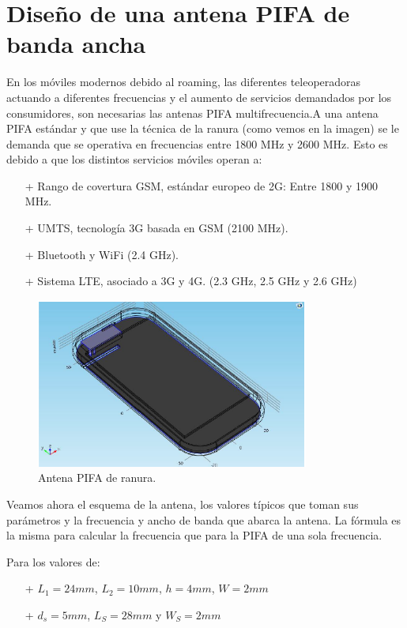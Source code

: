 \documentclass[a4paper,11pt,titlepage]{article}
\begin{document}
\section{Diseño de una antena PIFA de banda ancha}
En los móviles modernos debido al roaming, las diferentes teleoperadoras actuando a diferentes frecuencias y el aumento de servicios demandados por los consumidores, son necesarias las antenas PIFA multifrecuencia.A una antena PIFA estándar y que use la técnica de la ranura (como vemos en la imagen) se le demanda que se operativa en frecuencias entre 1800 MHz y 2600 MHz. Esto es debido a que los distintos servicios móviles operan a:\par
\begin{itemize}
\item[+] Rango de covertura GSM, estándar europeo de 2G: Entre 1800 y 1900 MHz.
\item[+] UMTS, tecnología 3G basada en GSM (2100 MHz).
\item[+] Bluetooth y WiFi (2.4 GHz).
\item[+] Sistema LTE, asociado a 3G y 4G. (2.3 GHz, 2.5 GHz y 2.6 GHz)
\end{itemize}
\begin{figure}[H]
\centering
\includegraphics[width=0.8\textwidth]{pifamulti}
\caption{Antena PIFA de ranura.}
\end{figure}
Veamos ahora el esquema de la antena, los valores típicos que toman sus parámetros y la frecuencia y ancho de banda que abarca la antena. La fórmula es la misma para calcular la frecuencia que para la PIFA de una sola frecuencia. \par
Para los valores de:
\begin{itemize}
\item[+] $L_1=24mm$, $L_2=10mm$, $h=4mm$, $W=2mm$
\item[+] $d_s=5mm$, $L_S=28mm$ y $W_S=2mm$
\end{itemize}
\end{document}
